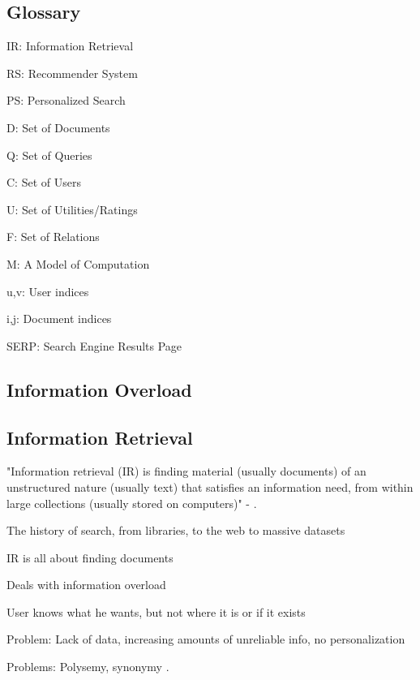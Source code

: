 \subsection{Glossary}

\begin{itemize*}
  \item IR: Information Retrieval 
  \item RS: Recommender System
  \item PS: Personalized Search
  \item D:  Set of Documents
  \item Q:  Set of Queries  
  \item C:  Set of Users
  \item U:  Set of Utilities/Ratings
  \item F:  Set of Relations
  \item M:  A Model of Computation
  \item u,v: User indices
  \item i,j: Document indices
  \item SERP: Search Engine Results Page
\end{itemize*}


\subsection{Information Overload}
\subsection{Information Retrieval}

"Information retrieval (IR) is finding material (usually documents)
of an unstructured nature (usually text) that satisfies an
information need, from within large collections 
(usually stored on computers)" - \cite[p1]{Manning2008}.

\begin{itemize*}
  \item The history of search, from libraries, to the web to massive datasets
  \item IR is all about finding documents
  \item Deals with information overload \cite{Bjorkoy2010d}
  \item User knows what he wants, but not where it is or if it exists
  \item Problem: Lack of data, increasing amounts of unreliable info, no personalization
  \item Problems: Polysemy, synonymy \cite[p4]{Micarelli2007}.
\end{itemize*}

